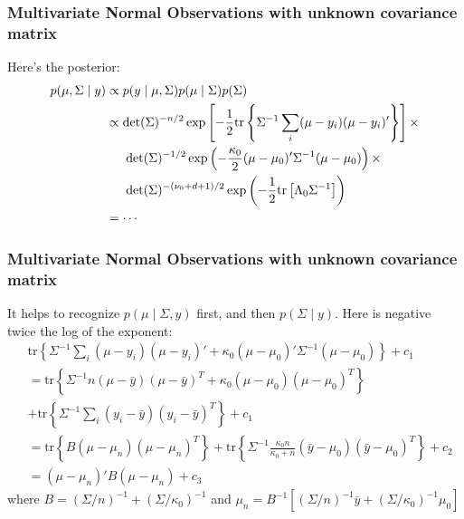 \documentclass{beamer}
\begin{document}
\begin{frame}[fragile]
\frametitle{Multivariate Normal Observations with unknown covariance matrix}

Here's the posterior:
\begin{align*}
p(\mu, \Sigma \mid y) &\propto p(y \mid \mu, \Sigma)p(\mu \mid \Sigma)p(\Sigma) \\
&\propto \det(\Sigma)^{-n/2} \exp\left[-\frac{1}{2} \text{tr}\left\{\Sigma^{-1} \sum_i (\mu-y_i)(\mu-y_i)' \right\} \right] \times \\
& \hspace{5mm} \det(\Sigma)^{-1/2}\exp\left(-\frac{\kappa_0}{2}(\mu - \mu_0)'\Sigma^{-1}(\mu - \mu_0) \right)  \times \\
& \hspace{5mm}    \det(\Sigma)^{-(\nu_0 + d + 1)/2}\exp\left( -\frac{1}{2} \text{tr}\left[\Lambda_0 \Sigma^{-1} \right] \right) \\
&= \cdots
\end{align*}


\end{frame}

\begin{frame}[fragile]
\frametitle{Multivariate Normal Observations with unknown covariance matrix}
It helps to recognize $p(\mu \mid \Sigma, y)$ first, and then $p(\Sigma \mid y)$. Here is negative twice the log of the exponent:
\begin{align*}
&\text{tr}\left\{\Sigma^{-1} \sum_i (\mu-y_i)(\mu-y_i)'  + \kappa_0(\mu - \mu_0)'\Sigma^{-1}(\mu - \mu_0)  \right\} + c_1 \\
&= \text{tr} \left\{\Sigma^{-1} n(\mu - \bar{y}) (\mu - \bar{y})^T +
  \kappa_0 (\mu - \mu_0)(\mu - \mu_0)^T \right\} 
\\
&+ \text{tr}\left\{\Sigma^{-1} \sum_i (y_i - \bar{y})(y_i -
  \bar{y})^T\right\} + c_1\\
&= \text{tr} \left\{B (\mu - \mu_n)(\mu - \mu_n)^T\right\} +
  \text{tr}\left\{\Sigma^{-1} \frac{\kappa_0 n}{\kappa_0 + n} (\bar{y} - \mu_0)(\bar{y} -
  \mu_0)^T \right\} + c_2 \\
&= (\mu - \mu_n)'B(\mu - \mu_n) + c_3 
\end{align*}
where $B = (\Sigma/n)^{-1} + (\Sigma/\kappa_0)^{-1}$ and $\mu_n = B^{-1}\left[ (\Sigma/n)^{-1}\bar{y} +  (\Sigma/\kappa_0)^{-1}\mu_0 \right]$
\end{frame}
\end{document}
